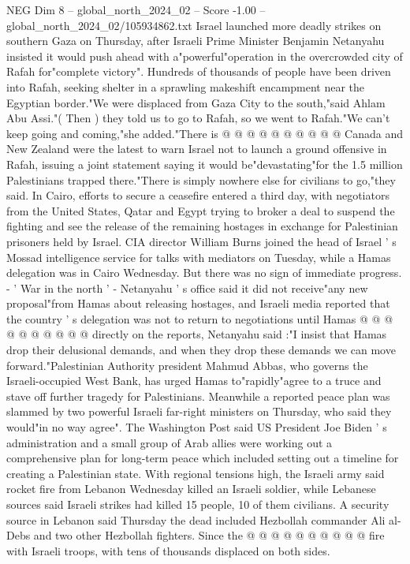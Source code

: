 \begin{textsample}{NEG Dim 8 – global\_north\_2024\_02 – Score -1.00 – global\_north\_2024\_02/105934862.txt}
Israel launched more deadly strikes on southern Gaza on Thursday, after Israeli Prime Minister Benjamin Netanyahu insisted it would push ahead with a"powerful"operation in the overcrowded city of Rafah for"complete victory".
Hundreds of thousands of people have been driven into Rafah, seeking shelter in a sprawling makeshift encampment near the Egyptian border."We were displaced from Gaza City to the south,"said Ahlam Abu Assi."( Then ) they told us to go to Rafah, so we went to Rafah."We can't keep going and coming,"she added."There is @ @ @ @ @ @ @ @ @ @ Canada and New Zealand were the latest to warn Israel not to launch a ground offensive in Rafah, issuing a joint statement saying it would be"devastating"for the 1.5 million Palestinians trapped there."There is simply nowhere else for civilians to go,"they said.
In Cairo, efforts to secure a ceasefire entered a third day, with negotiators from the United States, Qatar and Egypt trying to broker a deal to suspend the fighting and see the release of the remaining hostages in exchange for Palestinian prisoners held by Israel.
CIA director William Burns joined the head of Israel ' s Mossad intelligence service for talks with mediators on Tuesday, while a Hamas delegation was in Cairo Wednesday.
But there was no sign of immediate progress. - ' War in the north ' - Netanyahu ' s office said it did not receive"any new proposal"from Hamas about releasing hostages, and Israeli media reported that the country ' s delegation was not to return to negotiations until Hamas @ @ @ @ @ @ @ @ @ @ directly on the reports, Netanyahu said :"I insist that Hamas drop their delusional demands, and when they drop these demands we can move forward."Palestinian Authority president Mahmud Abbas, who governs the Israeli-occupied West Bank, has urged Hamas to"rapidly"agree to a truce and stave off further tragedy for Palestinians.
Meanwhile a reported peace plan was slammed by two powerful Israeli far-right ministers on Thursday, who said they would"in no way agree".
The Washington Post said US President Joe Biden ' s administration and a small group of Arab allies were working out a comprehensive plan for long-term peace which included setting out a timeline for creating a Palestinian state.
With regional tensions high, the Israeli army said rocket fire from Lebanon Wednesday killed an Israeli soldier, while Lebanese sources said Israeli strikes had killed 15 people, 10 of them civilians.
A security source in Lebanon said Thursday the dead included Hezbollah commander Ali al-Debs and two other Hezbollah fighters.
Since the @ @ @ @ @ @ @ @ @ @ fire with Israeli troops, with tens of thousands displaced on both sides.

\end{textsample}
